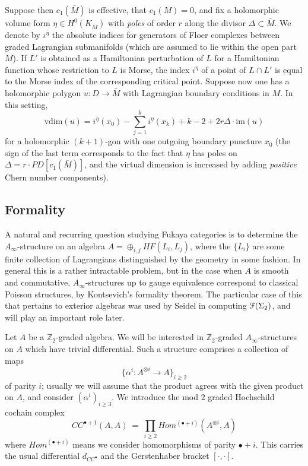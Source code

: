 \documentclass[reqno,10pt]{amsart}
\numberwithin{equation}{section}
\newcommand{\bZ}{{\mathbb Z}}
\newcommand{\scrF}{\EuScript{F}}
\newcommand{\im}{\mathrm{im}}
\theoremstyle{remark}
\begin{document}
Suppose then $c_1(\bar{M})$ is effective, that $c_1(M) = 0$,  and fix a holomorphic volume form $\eta \in H^0(K_{\bar{M}})$ with \emph{poles} of order $r$ along the divisor $\Delta \subset \bar{M}$.  We denote by $\iota^{\eta}$ the absolute indices for generators of Floer complexes between graded Lagrangian submanifolds (which are assumed to lie within the open part $M$).   If $L'$ is obtained as a Hamiltonian perturbation of $L$ for a Hamiltonian function whose restriction to $L$ is Morse,  the index $i^{\eta}$ of a point of $L\cap L'$ is equal to the Morse index of the corresponding critical point. Suppose now one has a holomorphic polygon $u:D\rightarrow \bar{M}$ with Lagrangian boundary conditions in $M$.  In this setting,
\begin{equation} \label{Eqn:IndexFormula}
\textrm{vdim}(u) = i^{\eta}(x_0) - \sum_{j=1}^k i^{\eta}(x_k) + k -2 + 2r \Delta \cdot \im (u)
\end{equation}
for a holomorphic $(k+1)$-gon with one outgoing boundary puncture $x_0$ (the sign of the last term corresponds to the fact that $\eta$ has poles on $\Delta = r\cdot PD[c_1(\bar{M})]$, and the virtual dimension is increased by adding \emph{positive} Chern number components).







\subsection{Formality\label{Section:Formality}}

A natural and recurring question studying Fukaya categories is to determine the $A_{\infty}$-structure on an algebra  $A=\oplus_{i,j} HF(L_i,L_j)$, where the $\{L_i\}$ are some finite collection of Lagrangians distinguished by the geometry in some fashion.  In general this is a rather intractable problem, but in the case when $A$ is smooth and commutative, $A_{\infty}$-structures up to gauge equivalence correspond to classical Poisson structures, by Kontsevich's formality theorem.  The particular case of this that pertains to exterior algebras was used by Seidel in computing $\scrF(\Sigma_2)$, and will play an important role later.  



Let $A$ be a $\bZ_2$-graded algebra.  We will be interested in $\bZ_2$-graded $A_{\infty}$-structures on $A$ which have trivial differential. Such a structure comprises a collection of maps 
\[
\{ \alpha^i: A^{\otimes i} \rightarrow A \}_{i\geq 2}
\]
of parity $i$; usually we will assume that the product agrees with the given product on $A$, and consider $(\alpha^i)_{i\geq 3}$.  We introduce the mod 2 graded Hochschild cochain complex
\[
CC^{\bullet+1}(A,A) \ = \ \prod_{i \geq 2} Hom^{(\bullet+i)}(A^{\otimes i},A)
\]
where $Hom^{(\bullet +i)}$ means we consider homomorphisms of parity $\bullet+i$. This carries the usual differential $d_{CC^{\bullet}}$ and the Gerstenhaber bracket $[\cdot, \cdot]$.
\end{document}
